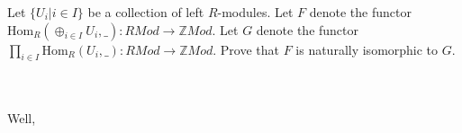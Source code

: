 Let $\{U_i|i\in I\}$ be a collection of left $R$-modules. Let $F$ denote the functor
$\text{Hom}_R(\oplus_{i\in I}U_i,\_):RMod\to \mathbb{Z}Mod$. Let $G$ denote the functor
$\prod_{i\in I}\text{Hom}_R(U_i,\_):RMod\to \mathbb{Z}Mod$. Prove that $F$ is naturally isomorphic to
$G$.\\\\

\begin{solution}\renewcommand{\qedsymbol}{}\ \\
    Well,
\end{solution}